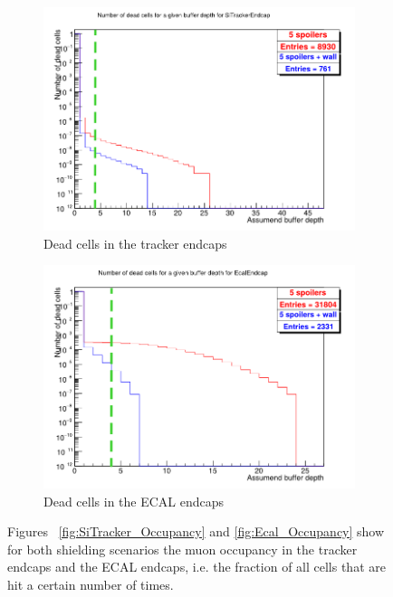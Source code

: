 \begin{figure}
\begin{subfigure}[b]{0.49\textwidth}
    \centering
        \includegraphics[height=0.27\textheight]{figures/SiTrackerEndcap_DeadCells.png}
        \caption{Dead cells in the tracker endcaps}
	\label{fig:SiTracker_DeadCells}
    \end{subfigure}
    \begin{subfigure}[b]{0.49\textwidth}
    \centering
        \includegraphics[height=0.27\textheight]{figures/EcalEndcap_DeadCells.png}
        \caption{Dead cells in the ECAL endcaps}
        \label{fig:Ecal_DeadCells}
    \end{subfigure}
    \caption[Muon occupancy in the tracker endcaps and ECAL endcaps]{
    Figures ~\ref{fig:SiTracker_Occupancy} and \ref{fig:Ecal_Occupancy} show for both shielding scenarios the muon occupancy in the tracker endcaps and the ECAL endcaps, i.e. the fraction of all cells that are hit a certain number of times.
}
\end{figure}
